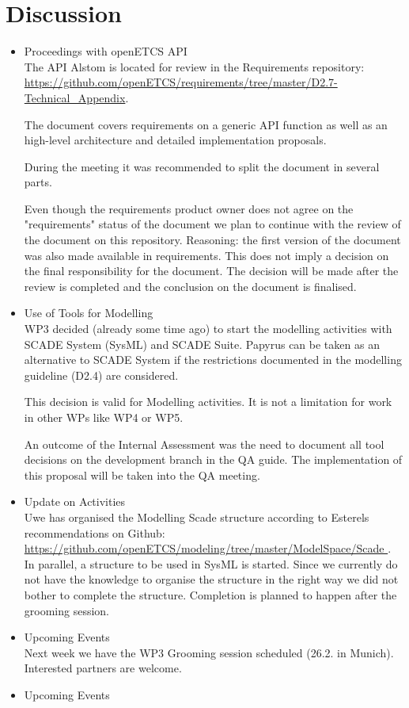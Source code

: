 \documentclass[a4paper, 11pt]{article}
\begin{document}
\section{Discussion}
\begin{itemize}
\item Proceedings with openETCS API\\
The API Alstom is located for review in the Requirements repository: \url{https://github.com/openETCS/requirements/tree/master/D2.7-Technical_Appendix}.

The document covers requirements on a generic API function as well as an high-level architecture and detailed implementation proposals.

During the meeting it was recommended to split the document in several parts.

Even though the requirements product owner does not agree on the "requirements" status of the document we plan to continue with the review of the document on this repository. Reasoning: the first version of the document was also made available in requirements.
This does not imply a decision on the final responsibility for the document. The decision will be made after the review is completed and the conclusion on the document is finalised.

\item Use of Tools for Modelling\\
WP3 decided (already some time ago) to start the modelling activities with SCADE System (SysML) and SCADE Suite. Papyrus can be taken as an alternative to SCADE System if the restrictions documented in the modelling guideline (D2.4) are considered.

This decision is valid for Modelling activities. It is not a limitation for work in other WPs like WP4 or WP5.

An outcome of the Internal Assessment was the need to document all tool decisions on the development branch in the QA guide. The implementation of this proposal will be taken into the QA meeting.

\item Update on Activities\\
Uwe has organised the Modelling Scade structure according to Esterels recommendations on Github: \url{https://github.com/openETCS/modeling/tree/master/ModelSpace/Scade }.
In parallel, a structure to be used in SysML is started. Since we currently do not have the knowledge to organise the structure in the right way we did not bother to complete the structure. Completion is planned to happen after the grooming session.


\item Upcoming Events\\
Next week we have the WP3 Grooming session scheduled (26.2. in Munich). Interested partners are welcome.

\item Upcoming Events 
\end{itemize}
\end{document}
